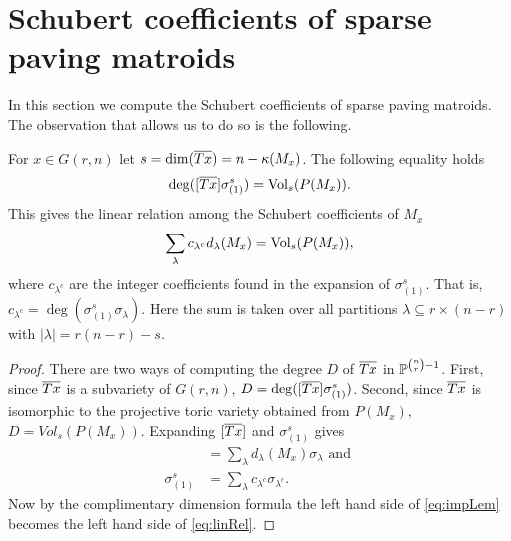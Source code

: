 \section{Schubert coefficients of sparse paving matroids}
In this section we compute the Schubert coefficients of sparse paving matroids. The observation that allows us to do so is the following.
\begin{proposition}
    \label{prop:VolDeg}
    For $x \in G(r,n)$ let $s = \dim({\overline{Tx}}) = n - \kappa(M_x)$. The following equality holds
    \begin{equation}
        \label{eq:impLem}
        \deg([{\overline{Tx}}]\sigma_{(1)}^s) = \operatorname{\mathrm{Vol}}_s(P(M_x)).
    \end{equation}
    This gives the linear relation among the Schubert coefficients of $M_x$ 
    \begin{equation}
        \label{eq:linRel}
        \sum_\lambda c_{\lambda^c} d_\lambda(M_x) = \operatorname{\mathrm{Vol}}_s(P(M_x)),
    \end{equation}
    where $c_{\lambda^c}$ are the integer coefficients found in the expansion of $\sigma_{(1)}^s$. That is,  $c_{\lambda^c} = \deg(\sigma_{(1)}^s \sigma_{\lambda}).$ Here the sum is taken over all partitions $\lambda \subseteq r\times(n-r)$ with $|\lambda| = r(n-r) - s$.
\end{proposition}
\begin{proof}
    There are two ways of computing the degree $D$ of ${\overline{Tx}}$ in ${\mathbb P}^{\binom{n}{r}-1}$. First, since ${\overline{Tx}}$ is a subvariety of $G(r,n)$, $D = \deg([{\overline{Tx}}]\sigma_{(1)}^s)$. Second, since ${\overline{Tx}}$ is isomorphic to the projective toric variety obtained from $P(M_x)$, $D = Vol_s(P(M_x))$. Expanding $[{\overline{Tx}}]$ and $\sigma_{(1)}^s$ gives
    \begin{align*}
        [\T] &= \sum_\lambda d_\lambda(M_x)\sigma_\lambda \text{ and }\\
        \sigma_{(1)}^s &= \sum_\lambda c_{\lambda^c} \sigma_{\lambda^c}.
    \end{align*}
    Now by the complimentary dimension formula the left hand side of \cref{eq:impLem} becomes the left hand side of \cref{eq:linRel}.
\end{proof}

